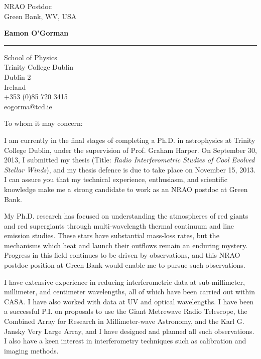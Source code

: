 \documentclass[10pt]{letter} %
\begin{document}
\longindentation=0pt                       %
\let\raggedleft\raggedright                %
 
\begin{letter}{NRAO Postdoc \\
Green Bank, WV, USA \\
}

\begin{flushleft}
{\large\bf Eamon O'Gorman}
\end{flushleft}
\medskip\hrule height 1pt
\begin{flushright}
\hfill School of Physics \\
\hfill Trinity College Dublin \\
\hfill Dublin 2 \\
\hfill Ireland \\
\hfill +353 (0)85 720 3415 \\
\hfill eogorma@tcd.ie \\

\end{flushright} 
\vfill %

\opening{To whom it may concern:} 

 
\noindent I am currently in the final stages of completing a Ph.D. in astrophysics at Trinity College Dublin, under the supervision of Prof. Graham Harper. On September 30, 2013, I submitted my thesis (Title: \textit{Radio Interferometric Studies of Cool Evolved Stellar Winds}), and my thesis defence is due to take place on November 15, 2013. I can assure you that my technical experience, enthusiasm, and scientific knowledge make me a strong candidate to work as an NRAO postdoc at Green Bank. 

\noindent My Ph.D. research has focused on understanding the atmospheres of red giants and red supergiants through multi-wavelength thermal continuum and line emission studies. These stars have substantial mass-loss rates, but the mechanisms which heat and launch their outflows remain an enduring mystery. Progress in this field continues to be driven by observations, and this NRAO postdoc position at Green Bank would enable me to pursue such observations. 

\noindent I have extensive experience in reducing interferometric data at sub-millimeter, millimeter, and centimeter wavelengths, all of which have been carried out within CASA. I have also worked with data at UV and optical wavelengths. I have been a successful P.I. on proposals to use the Giant Metrewave Radio Telescope, the Combined Array for Research in Millimeter-wave Astronomy, and the Karl G. Jansky Very Large Array, and I have designed and planned all such observations. I also have a keen interest in interferometry techniques such as calibration and imaging methods.


\end{letter}
\end{document}
